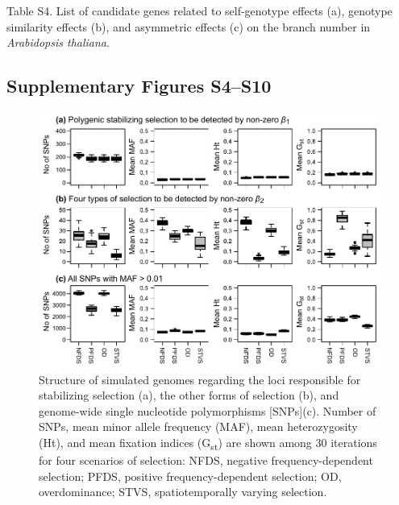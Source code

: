 \documentclass[12pt,]{article}
\begin{document}
\medskip
\noindent
Table S4. List of candidate genes related to self-genotype effects (a), genotype similarity effects (b), and asymmetric effects (c) on the branch number in \textit{Arabidopsis thaliana}.

\newpage
\subsection*{Supplementary Figures S4--S10}

\begin{figure}[ht]
  \includegraphics[width=\linewidth]{SimGenomeSummary.pdf}
  \caption{Structure of simulated genomes regarding the loci responsible for stabilizing selection (a), the other forms of selection (b), and genome-wide single nucleotide polymorphisms [SNPs](c). Number of SNPs, mean minor allele frequency (MAF), mean heterozygosity (Ht), and mean fixation indices (G\textsubscript{st}) are shown among 30 iterations for four scenarios of selection: NFDS, negative frequency-dependent selection; PFDS, positive frequency-dependent selection; OD, overdominance; STVS, spatiotemporally varying selection.}
  \label{figS4:GenStr}
\end{figure}
\end{document}
